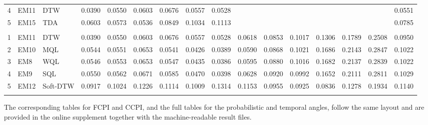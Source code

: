 \documentclass[12pt]{article}
\begin{document}
\begin{table}[htbp]
\begin{threeparttable}
\begin{tabular}{@{}r l l *{12}{r} r@{}}
4 & EM11 & DTW & 0.0390 & 0.0550 & 0.0603 & 0.0676 & 0.0557 & 0.0528 &  &  &  &  &  &  & 0.0551 \\
5 & EM15 & TDA & 0.0603 & 0.0573 & 0.0536 & 0.0849 & 0.1034 & 0.1113 &  &  &  &  &  &  & 0.0785 \\
\addlinespace[2pt]
\multicolumn{16}{@{}l}{\textit{Panel D: 12-month window (mean of $M_1$--$M_{12}$)}} \\[1pt]
1 & EM11 & DTW & 0.0390 & 0.0550 & 0.0603 & 0.0676 & 0.0557 & 0.0528 & 0.0618 & 0.0853 & 0.1017 & 0.1306 & 0.1789 & 0.2508 & 0.0950 \\
2 & EM10 & MQL & 0.0544 & 0.0551 & 0.0653 & 0.0541 & 0.0426 & 0.0389 & 0.0590 & 0.0868 & 0.1021 & 0.1686 & 0.2143 & 0.2847 & 0.1022 \\
3 & EM8 & WQL & 0.0546 & 0.0553 & 0.0653 & 0.0547 & 0.0435 & 0.0386 & 0.0595 & 0.0880 & 0.1016 & 0.1682 & 0.2137 & 0.2839 & 0.1022 \\
4 & EM9 & SQL & 0.0550 & 0.0562 & 0.0671 & 0.0585 & 0.0470 & 0.0398 & 0.0628 & 0.0920 & 0.0992 & 0.1652 & 0.2111 & 0.2811 & 0.1029 \\
5 & EM12 & Soft-DTW & 0.0917 & 0.1024 & 0.1226 & 0.1114 & 0.1009 & 0.1314 & 0.1153 & 0.0955 & 0.0925 & 0.0836 & 0.1278 & 0.1934 & 0.1140 \\
\addlinespace[2pt]
\bottomrule
\end{tabular}
\end{threeparttable}
\end{table}

\medskip
\noindent The corresponding tables for FCPI and CCPI, and the full tables for
the probabilistic and temporal angles, follow the same layout and are provided
in the online supplement together with the machine-readable result files.

\clearpage



\end{document}
